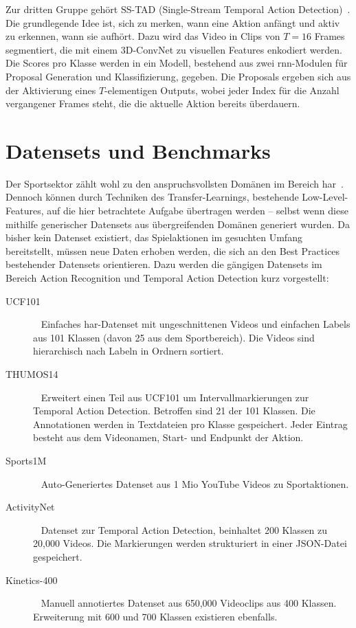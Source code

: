 Zur dritten Gruppe gehört \ua SS-TAD (Single-Stream Temporal Action Detection)~\cite{Buch17}.
Die grundlegende Idee ist, sich zu merken, wann eine Aktion anfängt und aktiv zu erkennen, wann sie aufhört.
Dazu wird das Video in Clips von $T=16$ Frames segmentiert, die mit einem 3D-ConvNet zu visuellen Features enkodiert werden.
Die Scores pro Klasse werden in ein Modell, bestehend aus zwei \gls{rnn}-Modulen für Proposal Generation und Klassifizierung, gegeben.
Die Proposals ergeben sich aus der Aktivierung eines $T$-elementigen Outputs, wobei jeder Index für die Anzahl vergangener Frames steht, die die aktuelle Aktion bereits überdauern.

\section{Datensets und Benchmarks}
\label{sec:datensets-und-benchmarks}

Der Sportsektor zählt wohl zu den anspruchsvollsten Domänen im Bereich \gls{har}~\cite{Sozykin17}.
Dennoch können durch Techniken des Transfer-Learnings, bestehende Low-Level-Features, auf die hier betrachtete Aufgabe übertragen werden -- selbst wenn diese mithilfe generischer Datensets aus übergreifenden Domänen generiert wurden.
Da bisher kein Datenset existiert, das Spielaktionen im gesuchten Umfang bereitstellt, müssen neue Daten erhoben werden, die sich an den Best Practices bestehender Datensets orientieren.
Dazu werden die gängigen Datensets im Bereich Action Recognition und Temporal Action Detection kurz vorgestellt:

\begin{description}
    \item[UCF101]~\cite{Soomro12} Einfaches \gls{har}-Datenset mit ungeschnittenen Videos und einfachen Labels aus 101 Klassen (davon 25 aus dem Sportbereich).
    Die Videos sind hierarchisch nach Labeln in Ordnern sortiert.
    \item[THUMOS14]~\cite{THUMOS14} Erweitert einen Teil aus UCF101 um Intervallmarkierungen zur Temporal Action Detection.
    Betroffen sind 21 der 101 Klassen.
    Die Annotationen werden in Textdateien pro Klasse gespeichert.
    Jeder Eintrag besteht aus dem Videonamen, Start- und Endpunkt der Aktion.
    \item[Sports1M]~\cite{Karpathy14} Auto-Generiertes Datenset aus 1 Mio YouTube Videos zu Sportaktionen.
    \item[ActivityNet]~\cite{Caba15} Datenset zur Temporal Action Detection, beinhaltet 200 Klassen zu 20,000 Videos.
    Die Markierungen werden strukturiert in einer JSON-Datei gespeichert.
    \item[Kinetics-400]~\cite{Kay17} Manuell annotiertes Datenset aus 650,000 Videoclips aus 400 Klassen.
    Erweiterung mit 600 und 700 Klassen existieren ebenfalls.
\end{description}

